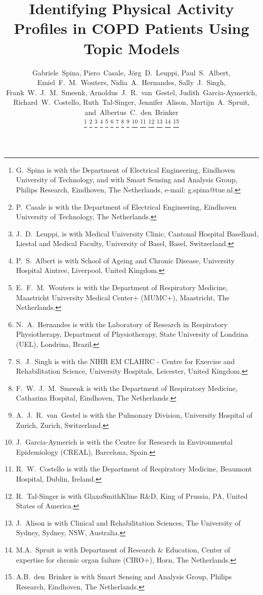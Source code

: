 \documentclass[journal]{IEEEtran}
\begin{document}
%
\title{Identifying Physical Activity Profiles in COPD Patients Using Topic Models}
%
%
%

\author{Gabriele~Spina,
        Piero~Casale,
        J\"{o}rg~D.~Leuppi,        
        Paul~S.~Albert,         
        Emiel~F.~M.~Wouters,        
        Nidia~A.~Hernandes,
        Sally~J.~Singh,        
		Frank~W.~J.~M.~Smeenk,
        Arnoldus~J.~R.~van~Gestel,        
		Judith~Garcia-Aymerich,
		Richard~W.~Costello,		
		Ruth~Tal-Singer,
		Jennifer~Alison,
        Martijn~A.~Spruit,
        and~Albertus~C.~den~Brinker%
        
        
\thanks{G.~Spina is with the Department
of Electrical Engineering, Eindhoven University of Technology, and with Smart Sensing and Analysis Group, Philips Research, Eindhoven, The Netherlands,
e-mail: g.spina@tue.nl.}%
\thanks{P.~Casale is with the Department
of Electrical Engineering, Eindhoven University of Technology, The Netherlands.}
\thanks{J.~D.~Leuppi, is with Medical University Clinic, Cantonal Hospital Baselland, Liestal and Medical Faculty, University of Basel, Basel, Switzerland.}
\thanks{P.~S.~Albert is with School of Ageing and Chronic Disease, University Hospital Aintree, Liverpool, United Kingdom.}
\thanks{E.~F.~M.~Wouters is with the Department of Respiratory Medicine, Maastricht University Medical Center+ (MUMC+), Maastricht, The Netherlands.}
\thanks{N.~A.~Hernandes is with the Laboratory of Research in Respiratory Physiotherapy, Department of Physiotherapy, State University of Londrina (UEL), Londrina, Brazil.}
\thanks{S.~J.~Singh is with the NIHR EM CLAHRC - Centre for Exercise and Rehabilitation Science, University Hospitals, Leicester, United Kingdom.}
\thanks{F.~W.~J.~M.~Smeenk is with the Department of Respiratory Medicine, Catharina Hospital, Eindhoven, The Netherlands.}
\thanks{A.~J.~R.~van~Gestel is with the Pulmonary Division, University Hospital of Zurich, Zurich, Switzerland.}
\thanks{J.~Garcia-Aymerich is with the Centre for Research in Environmental Epidemiology (CREAL), Barcelona, Spain.}
\thanks{R.~W.~Costello is with the Department of Respiratory Medicine, Beaumont Hospital, Dublin, Ireland.}
\thanks{R.~Tal-Singer is with GlaxoSmithKline R\&D, King of Prussia, PA, United States of America.}
\thanks{J.~Alison is with Clinical and Rehabilitation Sciences, The University of Sydney, Sydney, NSW, Australia.}
\thanks{M.A.~Spruit is with Department of Research \& Education, Center of expertise for chronic organ failure (CIRO+), Horn, The Netherlands.}
\thanks{A.B.~den~Brinker is with Smart Sensing and Analysis Group, Philips Research, Eindhoven, The Netherlands.}%
}
\end{document}
